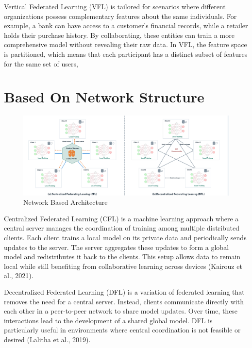 Vertical Federated Learning (VFL) is tailored for scenarios where different organizations possess complementary features about the same individuals. For example, a bank can have access to a customer’s financial records, while a retailer holds their purchase history. By collaborating, these entities can train a more comprehensive model without revealing their raw data. In VFL, the feature space is partitioned, which means that each participant has a distinct subset of features for the same set of users,





\section{Based On Network Structure}

\begin{figure}[H]
    \centering
    \includegraphics[width=1\linewidth]{Figures/network_based.png}
    \caption{Network Based Architecture}
    \label{fig:enter-label}
\end{figure}

Centralized Federated Learning (CFL) is a machine learning approach where a central server manages the coordination of training among multiple distributed clients. Each client trains a local model on its private data and periodically sends updates to the server. The server aggregates these updates to form a global model and redistributes it back to the clients. This setup allows data to remain local while still benefiting from collaborative learning across devices (Kairouz et al., 2021).

Decentralized Federated Learning (DFL) is a variation of federated learning that removes the need for a central server. Instead, clients communicate directly with each other in a peer-to-peer network to share model updates. Over time, these interactions lead to the development of a shared global model. DFL is particularly useful in environments where central coordination is not feasible or desired (Lalitha et al., 2019).




